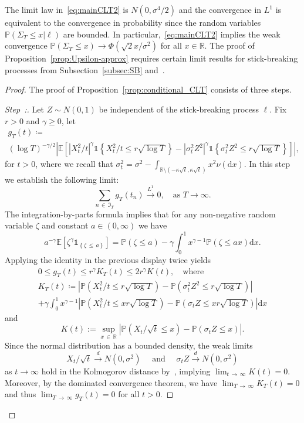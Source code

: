 \documentclass[AHL,Unicode,longabstracts,published]{cedram}
\newcommand\R{\mathbb{R}}
\newcommand\E{\mathds{E}}
\newcommand\p{\mathds{P}}
\newcommand\1{\mathds{1}}
\newcommand\D{\mathrm{d}}
\newcommand\GI{\mathfrak{I}}
\newcommand\cid{\xrightarrow{d}}
\newcommand\ciL{\xrightarrow{L^1}}
\newcounter{stepcount}
\newenvironment{step}{\refstepcounter{stepcount}\begin{proof}[Step~\thestepcount:]}{\let\qed\relax\end{proof}}
\begin{document}
The limit law in~\eqref{eq:mainCLT2} is $N(0,\sigma^4/2)$ and the convergence in $L^1$ is equivalent to the convergence in probability since the random variables $\p(\Sigma_T\le x|\ell)$ are bounded. In particular,~\eqref{eq:mainCLT2} implies the weak convergence $\p(\Sigma_T\le x)\to \Phi(\sqrt{2}x/\sigma^2)$ for all $x\in\R$. The proof of Proposition~\ref{prop:Upsilon-approx} requires certain limit results for stick-breaking processes from Subsection~\ref{subsec:SB} and~\cite[Theorem~1.1]{MR4285923}.


\begin{proof}
The proof of Proposition~\ref{prop:conditional_CLT} consists of three steps.

\begin{step}\label{proof-prop2.9-step1}
Let $Z \sim N(0,1)$ be independent of the stick-breaking process $\ell$. Fix $r>0$ and $\gamma\ge 0$, let
\begin{multline*}
g_T(t)\coloneqq\\
(\log T)^{-\gamma/2}\left|\E\left[\left|X_t^2/t\right|^{\gamma}\1{\left\{X_t^2/t\le r \sqrt{\log T}\right\}} - \left|\sigma_t^2 Z^2\right|^{\gamma}\1{\left\{\sigma_t^2 Z^2\le r \sqrt{\log T}\right\}}\right]\right|,
\end{multline*}
for $t>0$, where we recall that $\sigma_t^2=\sigma^2-\int_{\R\setminus(-\kappa\sqrt{t},\kappa\sqrt{t})}x^2\nu(\D x)$. In this step we establish the following limit:
\begin{equation}\label{eq:dctfordiff}
\sum_{n\,\in\,\GI_T} g_T(t_n)\ciL 0,
\quad\text{as }T\to\infty.
\end{equation}
The integration-by-parts formula implies that for any non-negative random variable $\zeta$ and constant $a\in(0,\infty)$ we have
\[
a^{-\gamma}\E \left[\zeta^\gamma\1 _{\left\{\zeta\,\le\,a\right\}}\right] =\p\left(\zeta\le a\right) -\gamma \int_0^1 x^{\gamma-1}
\p \left(\zeta \le ax\right)\D x.
\]
Applying the identity in the previous display twice yields
\begin{multline}\label{eq:summablegDCT}
0\le g_T(t)
\le r^{\gamma}K_T(t)
\le 2r^{\gamma}K(t),
\quad\text{where}\\
 K_T(t) \coloneqq \left|\p\left(X_t^2/t\le r\sqrt{\log T}\right) -\p\left(\sigma_t^2 Z^2\le r\sqrt{\log T}\right)\right| \\
+\gamma\int_0^1x^{\gamma-1}\left|\p\left(X_{t}^2/t\le xr\sqrt{\log T}\right)-\p\left(\sigma_t Z\le xr\sqrt{\log T}\right)\right|\D x
\end{multline}
and
\[
K(t):=\sup_{x\,\in\,\R}\left|\p\left(X_t/\sqrt{t}\le x\right)-\p\left(\sigma_t Z\le x\right)\right|.
\]
Since the normal distribution has a bounded density, the weak limits 
\[
X_t/\sqrt{t}\cid N\left(0,\sigma^2\right)\quad\text{ and }\quad\sigma_tZ\cid N\left(0,\sigma^2\right)
\]
 as $t\to\infty$ hold in the Kolmogorov distance by~\cite[1.8.31~\&~1.8.32,~p.~43]{MR1353441}, implying $\lim_{t\,\to\,\infty}K(t)=0$. Moreover, by the dominated convergence theorem, we have $\lim_{T\,\to\,\infty}K_T(t)=0$ and thus $\lim_{T\,\to\,\infty}g_T(t)=0$ for all $t>0$.



\end{step}
\end{proof}
\end{document}
